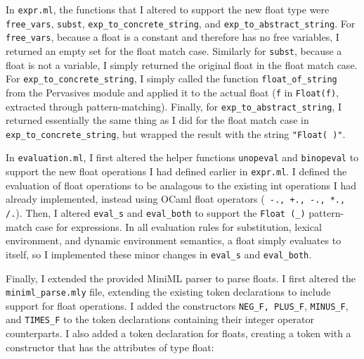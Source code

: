\documentclass[12pt]{extarticle}
\begin{document}
\vspace{0.3cm}
In \texttt{expr.ml}, the functions that I altered to support the new float type were \texttt{free_vars}, \texttt{subst}, \texttt{exp_to_concrete_string}, and \texttt{exp_to_abstract_string}. For \texttt{free_vars}, because a float is a constant and therefore has no free variables, I returned an empty set for the float match case. Similarly for \texttt{subst}, because a float is not a variable, I simply returned the original float in the float match case. For \texttt{exp_to_concrete_string}, I simply called the function \texttt{float_of_string} from the Pervasives module and applied it to the actual float (\texttt{f} in \texttt{Float(f)}, extracted through pattern-matching). Finally, for \texttt{exp_to_abstract_string}, I returned essentially the same thing as I did for the float match case in \texttt{exp_to_concrete_string}, but wrapped the result with the string \texttt{"Float( )"}.

\vspace{0.3cm}
In \texttt{evaluation.ml}, I first altered the helper functions \texttt{unopeval} and \texttt{binopeval} to support the new float operations I had defined earlier in \texttt{expr.ml}. I defined the evaluation of float operations to be analagous to the existing int operations I had already implemented, instead using OCaml float operators (\texttt{~-., +., -., *., /.}). Then, I altered \texttt{eval_s} and \texttt{eval_both} to support the \texttt{Float (_)} pattern-match case for expressions. In all evaluation rules for substitution, lexical environment, and dynamic environment semantics, a float simply evaluates to itself, so I implemented these minor changes in \texttt{eval_s} and \texttt{eval_both}.

\vspace{0.3cm}
Finally, I extended the provided MiniML parser to parse floats. I first altered the \texttt{miniml_parse.mly} file, extending the existing token declarations to include support for float operations. I added the constructors \texttt{NEG_F, PLUS_F}, \texttt{MINUS_F}, and \texttt{TIMES_F} to the token declarations containing their integer operator counterparts. I also added a token declaration for floats, creating a token with a constructor that has the attributes of type float:
\end{document}
